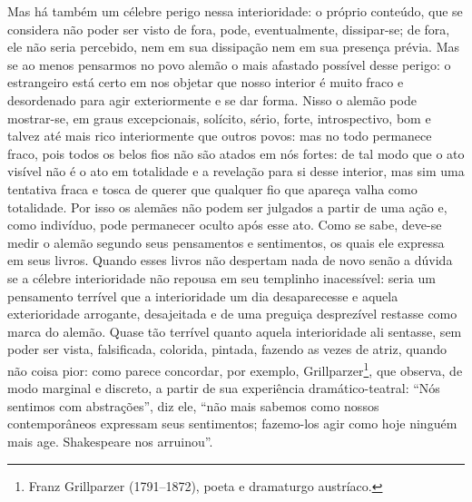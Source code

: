     Mas há também um célebre perigo nessa interioridade: o próprio
    conteúdo, que se considera não poder ser visto de fora, pode,
    eventualmente, dissipar-se; de fora, ele não seria percebido, nem em
    sua dissipação nem em sua presença prévia. Mas se ao menos pensarmos no
    povo alemão o mais afastado possível desse perigo: o estrangeiro
    está certo em nos objetar que nosso interior é muito fraco e
    desordenado para agir exteriormente e se dar forma. Nisso o alemão
    pode mostrar-se, em graus excepcionais, solícito, sério, forte,
    introspectivo, bom e talvez até mais rico interiormente que outros
    povos: mas no todo permanece fraco, pois todos os belos fios não são
    atados em nós fortes: de tal modo que o ato visível não é o ato em
    totalidade e a revelação para si desse interior, mas sim uma
    tentativa fraca e tosca de querer que qualquer fio que apareça valha
    como totalidade. Por isso os alemães não podem ser julgados a partir
    de uma ação e, como indivíduo, pode permanecer oculto após esse ato.
    Como se sabe, deve-se medir o alemão segundo seus pensamentos e
    sentimentos, os quais ele expressa em seus livros. Quando esses
    livros não despertam nada de novo senão a dúvida se a célebre
    interioridade não repousa em seu templinho inacessível: seria um
    pensamento terrível que a interioridade um dia desaparecesse e
    aquela exterioridade arrogante, desajeitada e de uma preguiça
    desprezível restasse como marca do alemão. Quase tão terrível quanto
    aquela interioridade ali sentasse, sem poder ser vista, falsificada,
    colorida, pintada, fazendo as vezes de atriz, quando não coisa pior:
    como parece concordar, por exemplo, Grillparzer\footnote{Franz
      Grillparzer (1791--1872), poeta e dramaturgo austríaco.}, que
    observa, de modo marginal e discreto, a partir de sua experiência
    dramático-teatral: ``Nós sentimos com abstrações'', diz ele, 
    ``não mais sabemos como nossos contemporâneos expressam seus sentimentos; 
    fazemo-los agir como  hoje ninguém mais age. Shakespeare nos arruinou''.

